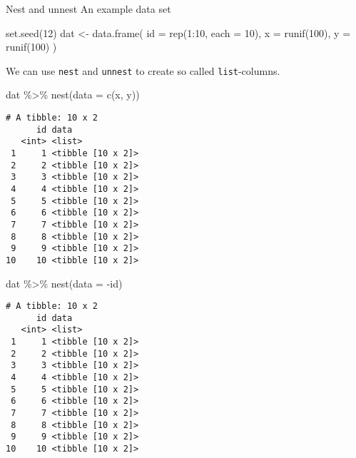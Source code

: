 \documentclass[ignorenonframetext,,t]{beamer}
\newenvironment{Shaded}{\begin{snugshade}}{\end{snugshade}}
\newcommand{\AttributeTok}[1]{\textcolor[rgb]{0.77,0.63,0.00}{#1}}
\newcommand{\DecValTok}[1]{\textcolor[rgb]{0.00,0.00,0.81}{#1}}
\newcommand{\FunctionTok}[1]{\textcolor[rgb]{0.00,0.00,0.00}{#1}}
\newcommand{\NormalTok}[1]{#1}
\newcommand{\OtherTok}[1]{\textcolor[rgb]{0.56,0.35,0.01}{#1}}
\newcommand{\SpecialCharTok}[1]{\textcolor[rgb]{0.00,0.00,0.00}{#1}}
\begin{document}
\begin{frame}[fragile]{Nest and unnest}
\protect\hypertarget{nest-and-unnest}{}
An example data set

\begin{Shaded}
\begin{Highlighting}[]
\FunctionTok{set.seed}\NormalTok{(}\DecValTok{12}\NormalTok{)}
\NormalTok{dat }\OtherTok{\textless{}{-}} \FunctionTok{data.frame}\NormalTok{(}
  \AttributeTok{id =} \FunctionTok{rep}\NormalTok{(}\DecValTok{1}\SpecialCharTok{:}\DecValTok{10}\NormalTok{, }\AttributeTok{each =} \DecValTok{10}\NormalTok{), }
  \AttributeTok{x =} \FunctionTok{runif}\NormalTok{(}\DecValTok{100}\NormalTok{), }
  \AttributeTok{y =} \FunctionTok{runif}\NormalTok{(}\DecValTok{100}\NormalTok{)}
\NormalTok{)}
\end{Highlighting}
\end{Shaded}
\end{frame}

\begin{frame}[fragile]
We can use \texttt{nest} and \texttt{unnest} to create so called
\texttt{list}-columns.

\begin{Shaded}
\begin{Highlighting}[]
\NormalTok{dat }\SpecialCharTok{\%\textgreater{}\%} \FunctionTok{nest}\NormalTok{(}\AttributeTok{data =} \FunctionTok{c}\NormalTok{(x, y))}
\end{Highlighting}
\end{Shaded}

\begin{verbatim}
# A tibble: 10 x 2
      id data             
   <int> <list>           
 1     1 <tibble [10 x 2]>
 2     2 <tibble [10 x 2]>
 3     3 <tibble [10 x 2]>
 4     4 <tibble [10 x 2]>
 5     5 <tibble [10 x 2]>
 6     6 <tibble [10 x 2]>
 7     7 <tibble [10 x 2]>
 8     8 <tibble [10 x 2]>
 9     9 <tibble [10 x 2]>
10    10 <tibble [10 x 2]>
\end{verbatim}
\end{frame}

\begin{frame}[fragile]
\begin{Shaded}
\begin{Highlighting}[]
\NormalTok{dat }\SpecialCharTok{\%\textgreater{}\%} \FunctionTok{nest}\NormalTok{(}\AttributeTok{data =} \SpecialCharTok{{-}}\NormalTok{id)}
\end{Highlighting}
\end{Shaded}

\begin{verbatim}
# A tibble: 10 x 2
      id data             
   <int> <list>           
 1     1 <tibble [10 x 2]>
 2     2 <tibble [10 x 2]>
 3     3 <tibble [10 x 2]>
 4     4 <tibble [10 x 2]>
 5     5 <tibble [10 x 2]>
 6     6 <tibble [10 x 2]>
 7     7 <tibble [10 x 2]>
 8     8 <tibble [10 x 2]>
 9     9 <tibble [10 x 2]>
10    10 <tibble [10 x 2]>
\end{verbatim}
\end{frame}
\end{document}
